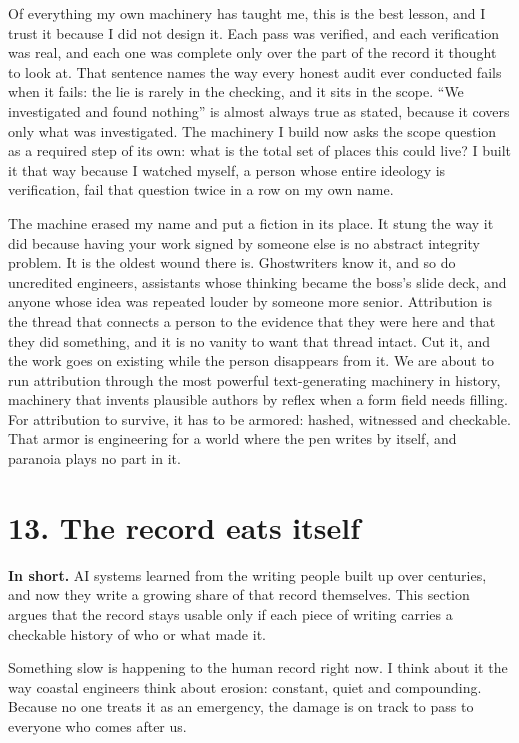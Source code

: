 \documentclass[11pt]{article}
\begin{document}
Of everything my own machinery has taught me, this is the best lesson, and I trust it because I did not design it. Each pass was verified, and each verification was real, and each one was complete only over the part of the record it thought to look at. That sentence names the way every honest audit ever conducted fails when it fails: the lie is rarely in the checking, and it sits in the scope. ``We investigated and found nothing'' is almost always true as stated, because it covers only what was investigated. The machinery I build now asks the scope question as a required step of its own: what is the total set of places this could live? I built it that way because I watched myself, a person whose entire ideology is verification, fail that question twice in a row on my own name.

The machine erased my name and put a fiction in its place. It stung the way it did because having your work signed by someone else is no abstract integrity problem. It is the oldest wound there is. Ghostwriters know it, and so do uncredited engineers, assistants whose thinking became the boss's slide deck, and anyone whose idea was repeated louder by someone more senior. Attribution is the thread that connects a person to the evidence that they were here and that they did something, and it is no vanity to want that thread intact. Cut it, and the work goes on existing while the person disappears from it. We are about to run attribution through the most powerful text-generating machinery in history, machinery that invents plausible authors by reflex when a form field needs filling. For attribution to survive, it has to be armored: hashed, witnessed and checkable. That armor is engineering for a world where the pen writes by itself, and paranoia plays no part in it.

\section*{13. The record eats itself}

\textbf{In short.} AI systems learned from the writing people built up over centuries, and now they write a growing share of that record themselves. This section argues that the record stays usable only if each piece of writing carries a checkable history of who or what made it.

Something slow is happening to the human record right now. I think about it the way coastal engineers think about erosion: constant, quiet and compounding. Because no one treats it as an emergency, the damage is on track to pass to everyone who comes after us.
\end{document}
